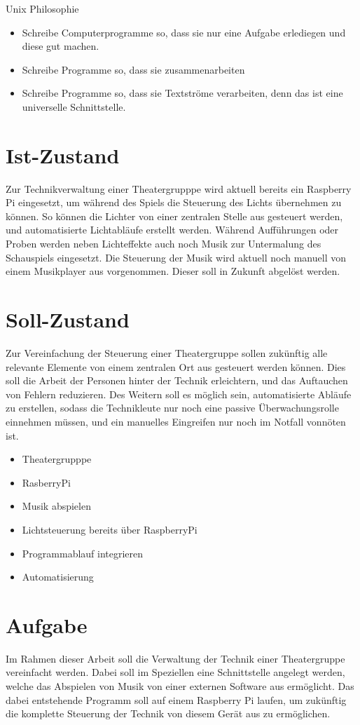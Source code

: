 Unix Philosophie
\begin{itemize}
\item Schreibe Computerprogramme so, dass sie nur eine Aufgabe erlediegen und
diese gut machen.
\item Schreibe Programme so, dass sie zusammenarbeiten
\item Schreibe Programme so, dass sie Textströme verarbeiten, denn das ist eine
universelle Schnittstelle.
\end{itemize}


\section{Ist-Zustand}
Zur Technikverwaltung einer Theatergrupppe wird aktuell bereits ein Raspberry
Pi eingesetzt, um während des Spiels die Steuerung des Lichts übernehmen zu
können. So können die Lichter von einer zentralen Stelle aus gesteuert werden,
und automatisierte Lichtabläufe erstellt werden. Während Aufführungen oder
Proben werden neben Lichteffekte auch noch Musik zur Untermalung des
Schauspiels eingesetzt. Die Steuerung der Musik wird aktuell noch manuell von
einem Musikplayer aus vorgenommen. Dieser soll in Zukunft abgelöst werden.

\section{Soll-Zustand}
Zur Vereinfachung der Steuerung einer Theatergruppe sollen zukünftig alle
relevante Elemente von einem zentralen Ort aus gesteuert werden können. Dies
soll die Arbeit der Personen hinter der Technik erleichtern, und das Auftauchen
von Fehlern reduzieren. Des Weitern soll es möglich sein, automatisierte
Abläufe zu erstellen, sodass die Technikleute nur noch eine passive
Überwachungsrolle einnehmen müssen, und ein manuelles Eingreifen nur noch im
Notfall vonnöten ist.

\begin{itemize}
\item Theatergrupppe
\item RasberryPi
\item Musik abspielen
\item Lichtsteuerung bereits über RaspberryPi
\item Programmablauf integrieren
\item Automatisierung
\end{itemize}

\section{Aufgabe}
Im Rahmen dieser Arbeit soll die Verwaltung der Technik einer Theatergruppe
vereinfacht werden. Dabei soll im Speziellen eine Schnittstelle angelegt
werden, welche das Abspielen von Musik von einer externen Software aus
ermöglicht. Das dabei entstehende Programm soll auf einem Raspberry Pi laufen,
um zukünftig die komplette Steuerung der Technik von diesem Gerät aus zu
ermöglichen.

